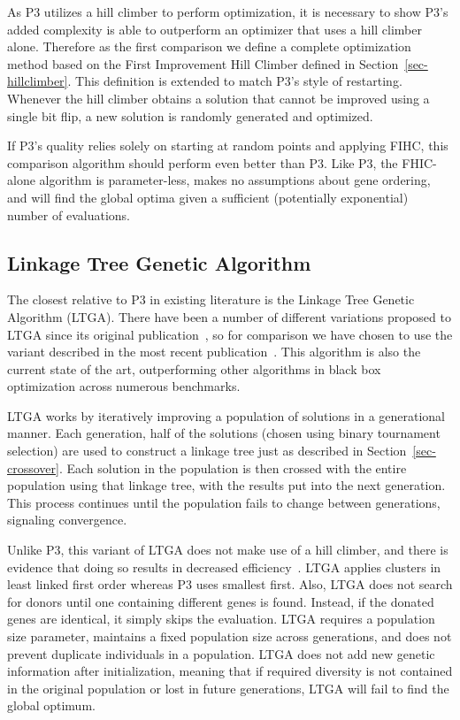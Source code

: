 \documentclass{sig-alternate}
\begin{document}
As P3 utilizes a hill climber to perform optimization, it is necessary
to show P3's added complexity is able to outperform an optimizer that
uses a hill climber alone.  Therefore as the first comparison we
define a complete optimization method based on the First Improvement
Hill Climber defined in Section~\ref{sec-hillclimber}.  This
definition is extended to match P3's style of restarting. Whenever the
hill climber obtains a solution that cannot be improved using a single
bit flip, a new solution is randomly generated and optimized.

If P3's quality relies solely on starting at random points and
applying FIHC, this comparison algorithm should perform even better
than P3.  Like P3, the FHIC-alone algorithm is parameter-less, makes no
assumptions about gene ordering, and will find the global optima given
a sufficient (potentially exponential) number of evaluations.

\subsection{Linkage Tree Genetic Algorithm}
\label{sec-ltga}
The closest relative to P3 in existing literature is the Linkage Tree Genetic Algorithm
(LTGA).  There have been a number of different variations proposed to LTGA since
its original publication~\cite{thierens:2010:ltga}, so for comparison we have chosen
to use the variant described in the most recent publication~\cite{thierens:2013:ltgahiff}.
This algorithm is also the current state of the art, outperforming other algorithms
in black box optimization across numerous benchmarks.

LTGA works by iteratively improving a population of solutions in a generational manner.
Each generation, half of the solutions (chosen using binary tournament selection)
are used to construct a linkage tree just as described in Section~\ref{sec-crossover}.
Each solution in the population is then crossed with the entire population using that
linkage tree, with the results put into the next generation.  This process continues
until the population fails to change between generations, signaling convergence.

Unlike P3, this variant of LTGA does not make use of a hill climber,
and there is evidence that doing so results in decreased
efficiency~\cite{bosman:2011:lsbbo}.  LTGA applies clusters in least
linked first order whereas P3 uses smallest first.  Also, LTGA does
not search for donors until one containing different genes is found.
Instead, if the donated genes are identical, it simply skips the
evaluation.  LTGA requires a population size parameter, maintains a
fixed population size across generations, and does not prevent
duplicate individuals in a population.  LTGA does not add new genetic
information after initialization, meaning that if required diversity
is not contained in the original population or lost in future
generations, LTGA will fail to find the global optimum.
\end{document}
